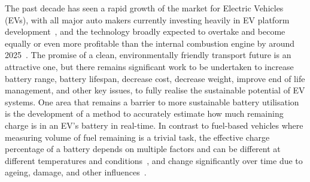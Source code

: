 %
%
The past decade has seen a rapid growth of the market for Electric Vehicles (EVs), with all major auto makers currently investing heavily in EV platform development~\cite{iea_global_2023}, and the technology broadly expected to overtake and become equally or even more profitable than the internal combustion engine by around 2025~\cite{baik_making_2019}.
The promise of a clean, environmentally friendly transport future is an attractive one, but there remains significant work to be undertaken to increase battery range, battery lifespan, decrease cost, decrease weight, improve end of life management, and other key issues, to fully realise the sustainable potential of EV systems.
One area that remains a barrier to more sustainable battery utilisation is the development of a method to accurately estimate how much remaining charge is in an EV's battery in real-time.
In contrast to fuel-based vehicles where measuring volume of fuel remaining is a trivial task, the effective charge percentage of a battery depends on multiple factors and can be different at different temperatures and conditions~\cite{xing_state_2014}, and change significantly over time due to ageing, damage, and other influences~\cite{johansson_neural_2018}.

